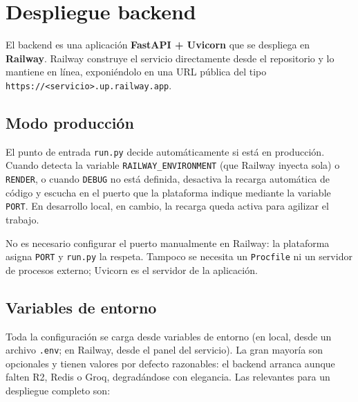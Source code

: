 \section{Despliegue backend}
\label{sec:deploy_backend}

El backend es una aplicación \textbf{FastAPI + Uvicorn} que se despliega en \textbf{Railway}. Railway construye el servicio directamente desde el repositorio y lo mantiene en línea, exponiéndolo en una URL pública del tipo \texttt{https://<servicio>.up.railway.app}.

\subsection{Modo producción}

El punto de entrada \texttt{run.py} decide automáticamente si está en producción. Cuando detecta la variable \texttt{RAILWAY\_ENVIRONMENT} (que Railway inyecta sola) o \texttt{RENDER}, o cuando \texttt{DEBUG} no está definida, desactiva la recarga automática de código y escucha en el puerto que la plataforma indique mediante la variable \texttt{PORT}. En desarrollo local, en cambio, la recarga queda activa para agilizar el trabajo.

\begin{remark}
No es necesario configurar el puerto manualmente en Railway: la plataforma asigna \texttt{PORT} y \texttt{run.py} la respeta. Tampoco se necesita un \texttt{Procfile} ni un servidor de procesos externo; Uvicorn es el servidor de la aplicación.
\end{remark}

\subsection{Variables de entorno}

Toda la configuración se carga desde variables de entorno (en local, desde un archivo \texttt{.env}; en Railway, desde el panel del servicio). La gran mayoría son opcionales y tienen valores por defecto razonables: el backend arranca aunque falten R2, Redis o Groq, degradándose con elegancia. Las relevantes para un despliegue completo son:


